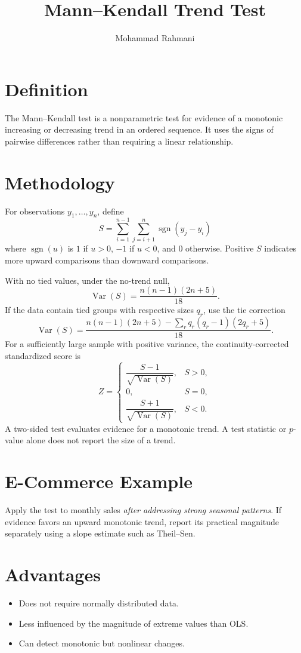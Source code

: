 \documentclass[a4paper]{article}
\title{Mann--Kendall Trend Test}
\date{}
\author{Mohammad Rahmani}
\begin{document}
\maketitle

\section{Definition}
The Mann--Kendall test is a nonparametric test for evidence of a monotonic increasing or decreasing trend in an ordered sequence. It uses the signs of pairwise differences rather than requiring a linear relationship.

\section{Methodology}
For observations $y_1,\ldots,y_n$, define
\[
 S=\sum_{i=1}^{n-1}\sum_{j=i+1}^{n}
 \operatorname{sgn}(y_j-y_i)
\]
where $\operatorname{sgn}(u)$ is $1$ if $u>0$, $-1$ if $u<0$, and $0$ otherwise. Positive $S$ indicates more upward comparisons than downward comparisons.

With no tied values, under the no-trend null,
\[
 \operatorname{Var}(S)=\frac{n(n-1)(2n+5)}{18}.
\]
If the data contain tied groups with respective sizes $q_r$, use the tie correction
\[
 \operatorname{Var}(S)=\frac{n(n-1)(2n+5)
 -\sum_rq_r(q_r-1)(2q_r+5)}{18}.
\]
For a sufficiently large sample with positive variance, the continuity-corrected standardized score is
\[
 Z=\begin{cases}
 \dfrac{S-1}{\sqrt{\operatorname{Var}(S)}}, & S>0,\\
 0, & S=0,\\
 \dfrac{S+1}{\sqrt{\operatorname{Var}(S)}}, & S<0.
 \end{cases}
\]
A two-sided test evaluates evidence for a monotonic trend. A test statistic or $p$-value alone does not report the size of a trend.

\section{E-Commerce Example}
Apply the test to monthly sales \emph{after addressing strong seasonal patterns}. If evidence favors an upward monotonic trend, report its practical magnitude separately using a slope estimate such as Theil--Sen.

\section{Advantages}
\begin{itemize}
 \item Does not require normally distributed data.
 \item Less influenced by the magnitude of extreme values than OLS.
 \item Can detect monotonic but nonlinear changes.
\end{itemize}
\end{document}
